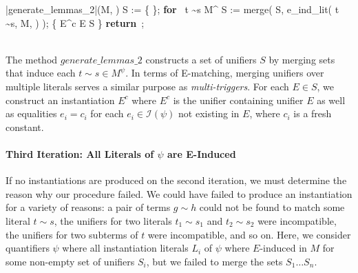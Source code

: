 \documentclass{llncs}
\newtheorem{thm}{Theorem}
\def\RETURN{\keyword{return}\ }
\def\ENDPROC{\untab}
\def\DOFOR{\qtab\keyword{for}\ }
\def\ENDFOR{\untab}
\def\keyword#1{\mbox{\normalshape\bf #1}}
\begin{document}
\begin{minipage}[t]{.4\linewidth}
\begin{program}
\PROC |generate\_lemmas\_2|(M, \psi) \BODY
  S := \{ \emptyset \};
  \DOFOR {} t \sim s \in M^\psi
    S := merge( S, e\_ind\_lit( t \sim s, M, \psi ) );
  \ENDFOR
   \{ E^c \mid E \in S \}
  \RETURN;
\ENDPROC
\end{program}
\end{minipage}

\ \\

The method $generate\_lemmas\_2$ constructs a set of unifiers $S$ by merging sets that induce each $t \sim s \in M^\psi$.
In terms of E-matching, merging unifiers over multiple literals serves a similar purpose as \emph{multi-triggers}.
For each $E \in S$, we construct an instantiation $E^c$ where $E^c$ is the unifier containing unifier $E$ as well as equalities $e_i = c_i$ for each $e_i \in \mathcal{I}( \psi )$ not existing in $E$, where $c_i$ is a fresh constant.

\begin{comment}
\begin{thm}
\label{thm:eind-ready}
Given a candidate-satisifiable DPLL(T) state $M \parallel F$, and a formula $\psi$ of the form $\forall \bar{x}. \varphi[ \bar{x} ]$ that is counterexample-active in $M \parallel F$ for $\bar{e}.
For all unifiers $\bar{e} = \bar{s}$ returned by the function $generate\_inst\_2$, we have that $\psi$ is $\bar{e}-\bar{s}$-induced in $M$.
\end{thm}
\begin{proof}
We must show $M \backslash M^\psi, \bar{e} = \bar{s} \models M^\psi$.

\end{proof}
Theorem~\ref{thm:eind-ready} states that if all instantiation literals for $\psi$ are induced by the same equality set $E$, then the corresponding instantiation $E^c$ is guarenteed to lead to a conflict.
\end{comment}

\paragraph{Third Iteration: All Literals of $\psi$ are E-Induced}

If no instantiations are produced on the second iteration, we must determine the reason why our procedure failed.
We could have failed to produce an instantiation for a variety of reasons: a pair of terms $g \sim h$ could not be found to match some literal $t \sim s$, the unifiers for two literals $t_1 \sim s_1$ and $t_2 \sim s_2$ were incompatible, the unifiers for two subterms of $t$ were incompatible, and so on.
Here, we consider quantifiers $\psi$ where all instantiation literals $L_i$ of $\psi$ where $E$-induced in $M$ for some non-empty set of unifiers $S_i$, but we failed to merge the sets $S_1 \ldots S_n$.
\end{document}
